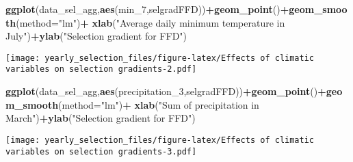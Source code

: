 \documentclass[]{article}
\newenvironment{Shaded}{\begin{snugshade}}{\end{snugshade}}
\newcommand{\KeywordTok}[1]{\textcolor[rgb]{0.13,0.29,0.53}{\textbf{#1}}}
\newcommand{\DataTypeTok}[1]{\textcolor[rgb]{0.13,0.29,0.53}{#1}}
\newcommand{\DecValTok}[1]{\textcolor[rgb]{0.00,0.00,0.81}{#1}}
\newcommand{\StringTok}[1]{\textcolor[rgb]{0.31,0.60,0.02}{#1}}
\newcommand{\CommentTok}[1]{\textcolor[rgb]{0.56,0.35,0.01}{\textit{#1}}}
\newcommand{\OperatorTok}[1]{\textcolor[rgb]{0.81,0.36,0.00}{\textbf{#1}}}
\newcommand{\NormalTok}[1]{#1}
\begin{document}
\begin{Shaded}
\begin{Highlighting}[]
\KeywordTok{ggplot}\NormalTok{(data_sel_agg,}\KeywordTok{aes}\NormalTok{(min_}\DecValTok{7}\NormalTok{,selgradFFD))}\OperatorTok{+}\KeywordTok{geom_point}\NormalTok{()}\OperatorTok{+}\KeywordTok{geom_smooth}\NormalTok{(}\DataTypeTok{method=}\StringTok{"lm"}\NormalTok{)}\OperatorTok{+}
\StringTok{  }\KeywordTok{xlab}\NormalTok{(}\StringTok{"Average daily minimum temperature in July"}\NormalTok{)}\OperatorTok{+}\KeywordTok{ylab}\NormalTok{(}\StringTok{"Selection gradient for FFD"}\NormalTok{)}
\end{Highlighting}
\end{Shaded}

\texttt{[image: yearly\_selection\_files/figure-latex/Effects of climatic variables on selection gradients-2.pdf]}

\begin{Shaded}
\begin{Highlighting}[]
\KeywordTok{ggplot}\NormalTok{(data_sel_agg,}\KeywordTok{aes}\NormalTok{(precipitation_}\DecValTok{3}\NormalTok{,selgradFFD))}\OperatorTok{+}\KeywordTok{geom_point}\NormalTok{()}\OperatorTok{+}\KeywordTok{geom_smooth}\NormalTok{(}\DataTypeTok{method=}\StringTok{"lm"}\NormalTok{)}\OperatorTok{+}
\StringTok{  }\KeywordTok{xlab}\NormalTok{(}\StringTok{"Sum of precipitation in March"}\NormalTok{)}\OperatorTok{+}\KeywordTok{ylab}\NormalTok{(}\StringTok{"Selection gradient for FFD"}\NormalTok{)}
\end{Highlighting}
\end{Shaded}

\texttt{[image: yearly\_selection\_files/figure-latex/Effects of climatic variables on selection gradients-3.pdf]}

\begin{Shaded}
\end{Shaded}
\end{document}
